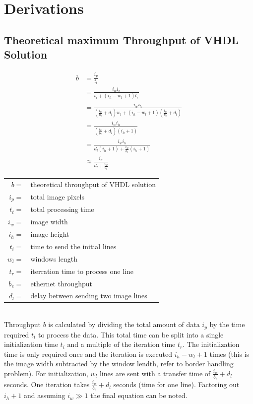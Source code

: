 \section{Derivations} \label{app:derivations}
\subsection{Theoretical maximum Throughput of VHDL Solution} \label{app:derivations:theomax}

\begin{align}
    b  & = \frac{i_p}{t_t} \\
       & = \frac{i_w i_h}{t_i+(i_h-w_l+1)t_r} \\
       & = \frac{i_w i_h}{(\frac{i_w}{b_e}+d_l)w_l+(i_h-w_l+1)(\frac{i_w}
       {b_e}+d_l)} \\
       & = \frac{i_w i_h}{(\frac{i_w}{b_e}+d_l)(i_h+1)} \\
       & = \frac{i_w i_h}{d_l(i_h+1)+\frac{i_w}{b_e}(i_h+1)} \\
       & \approx \frac{i_w}{d_l+\frac{i_w}{b_e}}
    \label{eq:theomaxb}
\end{align}
\begin{tabular}{rl}
    $b     =$ & theoretical throughput of VHDL solution \\
    $i_p   =$ & total image pixels \\
    $t_t   =$ & total processing time \\
    $i_w   =$ & image width \\
    $i_h   =$ & image height \\
    $t_i   =$ & time to send the initial lines \\
    $w_l   =$ & windows length \\
    $t_r   =$ & iterration time to process one line \\
    $b_e   =$ & ethernet throughput \\
    $d_l   =$ & delay between sending two image lines \\
\end{tabular} \\

Throughput $b$ is calculated by dividing the total amount of data $i_p$ by the
time required $t_t$ to process the data. This total time can be split into a
single initialization time $t_i$ and a multiple of the iteration time $t_r$. The
initialization time is only required once and the iteration is executed
$i_h-w_l+1$ times (this is the image width subtracted by the window lendth,
refer
to border handling problem). For initialization, $w_l$ lines are sent with a
transfer time of $\frac{i_w}{b_e} + d_l$ seconds. One iteration takes $
\frac{i_w}{b_e} + d_l$ seconds (time for one line). Factoring out $i_h+1$ and
assuming $i_w \gg 1$
the final equation can be noted.
\clearpage

